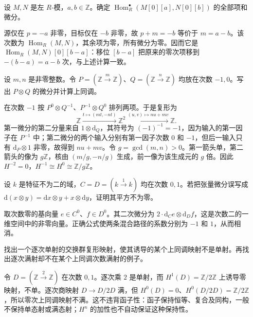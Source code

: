 \begin{exercise}\label{b4:ex:05-hom-support}
	设 \(M,N\) 是左 \(R\)-模，\(a,b\in\mathbb Z\)。确定 \(\operatorname{Hom}_R^\bullet(M[0][a],N[0][b])\) 的全部项和微分。
\end{exercise}
\begin{solution}
	源仅在 \(p=-a\) 非零，目标仅在 \(-b\) 非零，故 \(p+m=-b\) 等价于 \(m=a-b\)。该次数为 \(\operatorname{Hom}_R(M,N)\)，其余项为零，所有微分为零。因而它是 \(\operatorname{Hom}_R(M,N)[0][b-a]\)：移位 \([b-a]\) 把原来的零次项移到 \(-(b-a)=a-b\) 次，与上述计算一致。
\end{solution}

\begin{exercise}\label{b4:ex:05-tensor-integers}
	设 \(m,n\) 是非零整数。令 \(P=(\mathbb Z\xrightarrow{m}\mathbb Z)\)、\(Q=(\mathbb Z\xrightarrow{n}\mathbb Z)\) 均放在次数 \(-1,0\)。写出 \(P\otimes Q\) 的微分并计算上同调。
\end{exercise}
\begin{solution}
	在次数 \(-1\) 按 \(P^0\otimes Q^{-1}\)、\(P^{-1}\otimes Q^0\) 排列两项。于是复形为
	\[
		\mathbb Z\xrightarrow{t\mapsto(mt,-nt)}\mathbb Z^2 \xrightarrow{(u,v)\mapsto nu+mv}\mathbb Z.
	\]
	第一微分的第二分量来自 \(1\otimes\mathrm{d}_Q\)，其符号为 \((-1)^{-1}=-1\)，因为输入的第一因子在 \(P^{-1}\) 中；第二微分的两个输入分别有第一因子次数 \(0\) 和 \(-1\)，但后一输入只有 \(\mathrm{d}_P\otimes1\) 非零，故得到 \(nu+mv\)。令 \(g=\gcd(m,n)>0\)。第一箭头单，第二箭头的像为 \(g\mathbb Z\)，核由 \((m/g,-n/g)\) 生成，前一像为该生成元的 \(g\) 倍。因此 \(H^{-2}=0\)，\(H^{-1}\cong H^0\cong\mathbb Z/g\mathbb Z\)。
\end{solution}

\begin{exercise}\label{b4:ex:05-tensor-wrong-sign}
	设 \(k\) 是特征不为二的域，\(C=D=(k\xrightarrow{1}k)\) 均在次数 \(0,1\)。若把张量微分误写成 \(\mathrm{d}(x\otimes y)=\mathrm{d}x\otimes y+x\otimes \mathrm{d}y\)，证明其平方不为零。
\end{exercise}
\begin{solution}
	取次数零的基向量 \(e\in C^0\)、\(f\in D^0\)。其二次微分为 \(2\cdot\mathrm{d}_Ce\otimes \mathrm{d}_Df\)，这是次数二的一维空间中的非零向量。正确公式使两条混合路径的系数分别为 \(-1\) 和 \(1\)，从而相消。
\end{solution}

\begin{exercise}\label{b4:ex:05-homology-not-mono}
	找出一个逐次单射的交换群复形映射，使其诱导的某个上同调映射不是单射。再找出逐次满射却不在某个上同调次数满射的例子。
\end{exercise}
\begin{solution}
	令 \(D=(\mathbb Z\xrightarrow{2}\mathbb Z)\) 在次数 \(0,1\)。逐次乘 \(2\) 是单射，而 \(H^1(D)=\mathbb Z/2\mathbb Z\) 上诱导零映射，不单。逐次商映射 \(D\to D/2D\) 满，但 \(H^0(D)=0\)、\(H^0(D/2D)=\mathbb Z/2\mathbb Z\)，所以零次上同调映射不满。这不违背函子性：函子保持恒等、复合及同构，一般不保持单态射或满态射；\(H^n\) 的加性也不自动保证这种保持性。
\end{solution}

